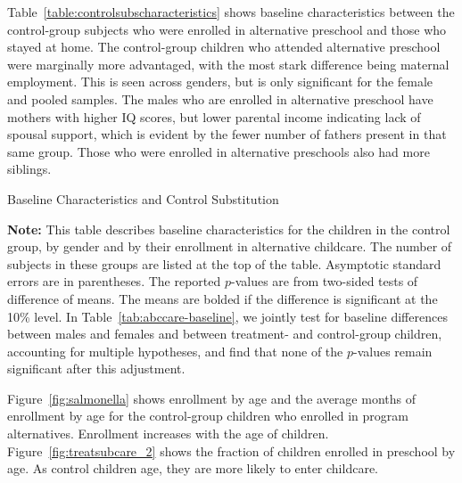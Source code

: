 Table~\ref{table:controlsubscharacteristics} shows baseline characteristics between the control-group subjects who were enrolled in alternative preschool and those who stayed at home. The control-group children who attended alternative preschool were marginally more advantaged, with the most stark difference being maternal employment. This is seen across genders, but is only significant for the female and pooled samples. The males who are enrolled in alternative preschool have mothers with higher IQ scores, but lower parental income indicating lack of spousal support, which is evident by the fewer number of fathers present in that same group. Those who were enrolled in alternative preschools also had more siblings.

\begin{table}
\centering
\begin{threeparttable}
\caption{Baseline Characteristics and Control Substitution}\label{table:controlsubscharacteristics}

\begin{tablenotes}
\item \footnotesize \textbf{Note:} This table describes baseline characteristics for the children in the control group, by gender and by their enrollment in alternative childcare. The number of subjects in these groups are listed at the top of the table. Asymptotic standard errors are in parentheses. The reported $p$-values are from two-sided tests of difference of means. The means are bolded if the difference is significant at the 10\% level. In Table~\ref{tab:abccare-baseline}, we jointly test for baseline differences between males and females and between treatment- and control-group children, accounting for multiple hypotheses, and find that none of the $p$-values remain significant after this adjustment.
\end{tablenotes}
\end{threeparttable}
\end{table}

Figure~\ref{fig:salmonella} shows enrollment by age and the average months of enrollment by age for the control-group children who enrolled in program alternatives. Enrollment increases with the age of children. Figure~\ref{fig:treatsubcare_2} shows the fraction of children enrolled in preschool by age. As control children age, they are more likely to enter childcare.

